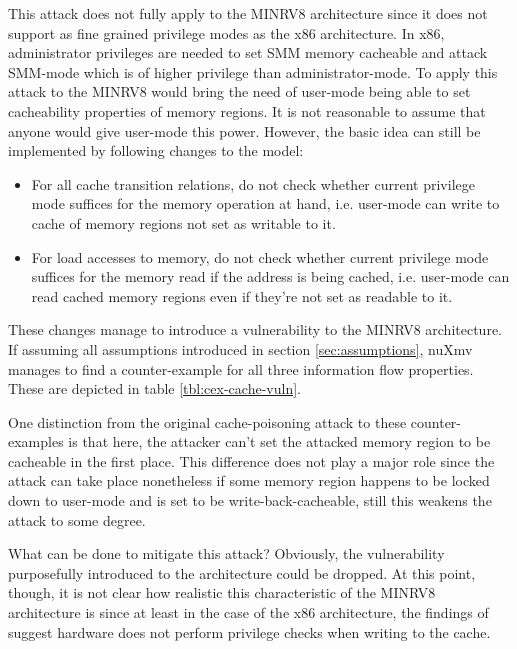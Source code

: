 This attack does not fully apply to the MINRV8 architecture since it does not support as fine grained privilege modes as the x86 architecture.
In x86, administrator privileges are needed to set SMM memory cacheable and attack SMM-mode which is of higher privilege than administrator-mode.
To apply this attack to the MINRV8 would bring the need of user-mode being able to set cacheability properties of memory regions.
It is not reasonable to assume that anyone would give user-mode this power.
However, the basic idea can still be implemented by following changes to the model:
\begin{itemize}
    \item For all cache transition relations, do not check whether current privilege mode suffices for the memory operation at hand, i.e. user-mode can write to cache of memory regions not set as writable to it.
    \item For load accesses to memory, do not check whether current privilege mode suffices for the memory read if the address is being cached, i.e. user-mode can read cached memory regions even if they're not set as readable to it.
\end{itemize}

These changes manage to introduce a vulnerability to the MINRV8 architecture.
If assuming all assumptions introduced in section \ref{sec:assumptions}, nuXmv manages to find a counter-example for all three information flow properties.
These are depicted in table \ref{tbl:cex-cache-vuln}.


One distinction from the original cache-poisoning attack to these counter-examples is that here, the attacker can't set the attacked memory region to be cacheable in the first place.
This difference does not play a major role since the attack can take place nonetheless if some memory region happens to be locked down to user-mode and is set to be write-back-cacheable, still this weakens the attack to some degree.

What can be done to mitigate this attack?
Obviously, the vulnerability purposefully introduced to the architecture could be dropped.
At this point, though, it is not clear how realistic this characteristic of the MINRV8 architecture is since at least in the case of the x86 architecture, the findings of \cite{Wojtczuk09} suggest hardware does not perform privilege checks when writing to the cache.

